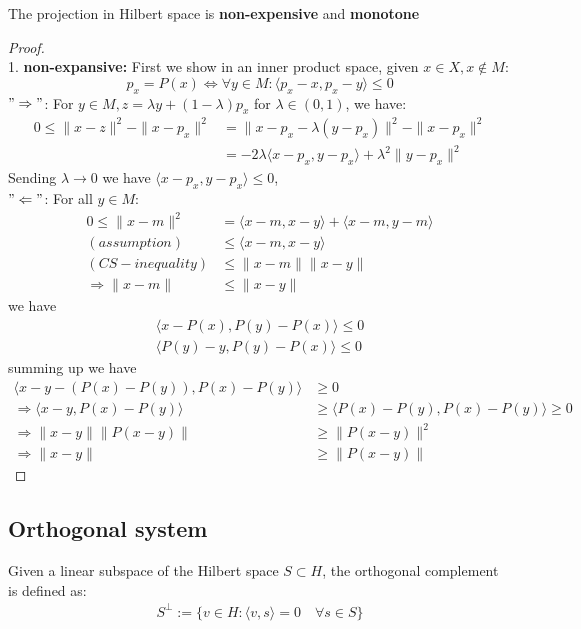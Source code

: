 \begin{theorem}
	The projection in Hilbert space is \textbf{non-expensive} and \textbf{monotone}
\end{theorem}
\begin{proof}\quad\\
1. \textbf{non-expansive:} First we show in an inner product space,  given $x \in X, x \notin M$:
 \begin{equation}
 	p_x = P(x) \Leftrightarrow  \forall y \in M: \langle p_x - x, p_x - y \rangle \le 0
 \end{equation} 
$"\Rightarrow"$: For $y \in M, z = \lambda y + (1-\lambda) p_x $ for $\lambda \in (0, 1)$, we have:
\begin{align*}
	0 \le \|x - z\|^2 - \|x - p_x\|^2 &= \|x - p_x - \lambda(y - p_x)\|^2 - \|x - p_x\|^2 \\
	&= - 2\lambda\langle x - p_x, y- p_x\rangle+ \lambda^2 \|y - p_x\|^2
\end{align*}    
Sending $\lambda \rightarrow 0$ we have $\langle x - p_x, y - p_x \rangle \le 0$,  \\
$"\Leftarrow"$: For all $y \in M:$
\begin{align*}
	0 \le \|x - m \|^2 &= \langle x - m, x- y\rangle + \langle x - m, y - m\rangle\\
(assumption)
	&\le \langle x - m, x - y\rangle\\
(CS-inequality)
	&\le \|x - m\| \|x - y\|\\
	\Rightarrow \|x - m\| &\le \|x - y\|
\end{align*}
we have
\begin{align*}
	\langle x - P(x), P(y) - P(x) \rangle \le 0\\
	\langle P(y) - y, P(y) - P(x) \rangle \le 0 
\end{align*}
summing up we have
\begin{align*}
	\langle x - y  - (P(x) - P(y)), P(x) - P(y) \rangle &\geq 0\\
	\Rightarrow \langle x - y, P(x) - P(y)\rangle &\geq \langle P(x) - P(y), P(x)-P(y) \rangle \ge 0\\
	\Rightarrow \|x -y \|\|P(x - y)\| & \geq \|P(x-y)\|^2\\
	\Rightarrow \|x-y\| & \geq \|P(x -y)\|
\end{align*}
\end{proof}


\subsection{Orthogonal system}
\begin{definition}
	Given a linear subspace of the Hilbert space $S \subset H$, the orthogonal complement is defined as:
	\begin{align*}
		S^\perp := \{ v \in H: \langle v, s \rangle = 0 \quad \forall s \in S \}
	\end{align*}
\end{definition}

